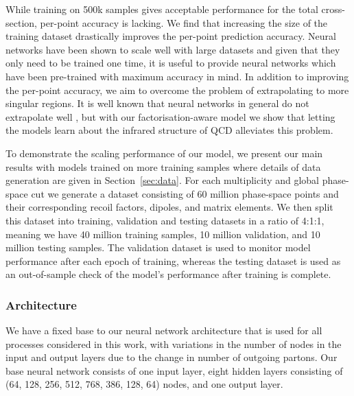\documentclass[main.tex]{subfiles}
\begin{document}
While training on 500k samples gives acceptable performance for the total cross-section, per-point accuracy is lacking.
We find that increasing the size of the training dataset drastically improves the per-point prediction accuracy.
Neural networks have been shown to scale well with large datasets \cite{hestness2017deep} and given that they only need to be trained one time, it is useful to provide neural networks which have been pre-trained with maximum accuracy in mind.
In addition to improving the per-point accuracy, we aim to overcome the problem of extrapolating to more singular regions.
It is well known that neural networks in general do not extrapolate well \cite{xu2021neural,kaplan2020scaling}, but with our factorisation-aware model we show that letting the models learn about the infrared structure of QCD alleviates this problem.

To demonstrate the scaling performance of our model, we present our main results with models trained on more training samples where details of data generation are given in Section~\ref{sec:data}.
For each multiplicity and global phase-space cut we generate a dataset consisting of 60 million phase-space points and their corresponding recoil factors, dipoles, and matrix elements.
We then split this dataset into training, validation and testing datasets in a ratio of 4:1:1, meaning we have 40 million training samples, 10 million validation, and 10 million testing samples.
The validation dataset is used to monitor model performance after each epoch of training, whereas the testing dataset is used as an out-of-sample check of the model's performance after training is complete.

\subsubsection{Architecture}\label{sec:architecture}
We have a fixed base to our neural network architecture that is used for all processes considered in this work, with variations in the number of nodes in the input and output layers due to the change in number of outgoing partons.
Our base neural network consists of one input layer, eight hidden layers consisting of (64, 128, 256, 512, 768, 386, 128, 64) nodes, and one output layer.
\end{document}
